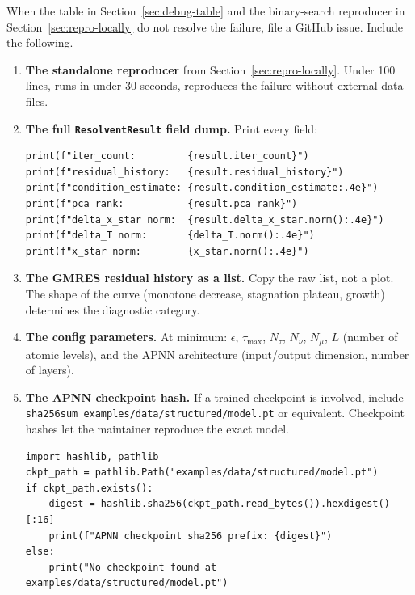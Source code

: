 When the table in Section~\ref{sec:debug-table} and the binary-search
reproducer in Section~\ref{sec:repro-locally} do not resolve the failure,
file a GitHub issue.
Include the following.

\begin{enumerate}
  \item \textbf{The standalone reproducer} from Section~\ref{sec:repro-locally}.
        Under 100 lines, runs in under 30 seconds, reproduces the failure without
        external data files.

  \item \textbf{The full \texttt{ResolventResult} field dump.}
        Print every field:
\begin{lstlisting}[style=grailInStyle]
print(f"iter_count:         {result.iter_count}")
print(f"residual_history:   {result.residual_history}")
print(f"condition_estimate: {result.condition_estimate:.4e}")
print(f"pca_rank:           {result.pca_rank}")
print(f"delta_x_star norm:  {result.delta_x_star.norm():.4e}")
print(f"delta_T norm:       {delta_T.norm():.4e}")
print(f"x_star norm:        {x_star.norm():.4e}")
\end{lstlisting}

  \item \textbf{The GMRES residual history as a list.}
        Copy the raw list, not a plot.
        The shape of the curve (monotone decrease, stagnation plateau, growth)
        determines the diagnostic category.

  \item \textbf{The config parameters.}
        At minimum: $\epsilon$, $\tau_\mathrm{max}$, $N_\tau$, $N_\nu$, $N_\mu$,
        $L$ (number of atomic levels), and the APNN architecture (input/output
        dimension, number of layers).

  \item \textbf{The APNN checkpoint hash.}
        If a trained checkpoint is involved, include
        \texttt{sha256sum examples/data/structured/model.pt} or equivalent.
        Checkpoint hashes let the maintainer reproduce the exact model.
\begin{lstlisting}[style=grailInStyle]
import hashlib, pathlib
ckpt_path = pathlib.Path("examples/data/structured/model.pt")
if ckpt_path.exists():
    digest = hashlib.sha256(ckpt_path.read_bytes()).hexdigest()[:16]
    print(f"APNN checkpoint sha256 prefix: {digest}")
else:
    print("No checkpoint found at examples/data/structured/model.pt")
\end{lstlisting}


\end{enumerate}
